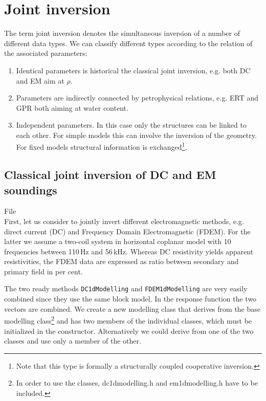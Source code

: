 \section{Joint inversion}\label{sec:joint}
The term joint inversion denotes the simultaneous inversion of a number of different data types.
We can classify different types according to the relation of the associated parameters:
\begin{enumerate}
	\item Identical parameters is historical the classical joint inversion, e.g. both DC and EM aim at $\rho$.
	\item Parameters are indirectly connected by petrophysical relations, e.g. ERT and GPR both aiming at water content.
	\item Independent parameters. In this case only the structures can be linked to each other. For simple models this can involve the inversion of the geometry. For fixed models structural information is exchanged\footnote{Note that this type is formally a structurally coupled cooperative inversion.}.
\end{enumerate}

\subsection{Classical joint inversion of DC and EM soundings}\label{sec:jointdcem}
File \\
First, let us consider to jointly invert different electromagnetic methods, e.g. direct current (DC) and Frequency Domain Electromagnetic (FDEM).
For the latter we assume a two-coil system in horizontal coplanar model with 10 frequencies between 110\,Hz and 56\,kHz.
Whereas DC resistivity yields apparent resistivities, the FDEM data are expressed as ratio between secondary and primary field in per cent.

The two ready methods \lstinline|DC1dModelling| and \lstinline|FDEM1dModelling| are very easily combined since they use the same block model.
In the response function the two vectors are combined.
We create a new modelling class that derives from the base modelling class\footnote{In order to use the classes, dc1dmodelling.h and em1dmodelling.h have to be included.} and has two members of the individual classes, which must be initialized in the constructor.
Alternatively we could derive from one of the two classes and use only a member of the other.

